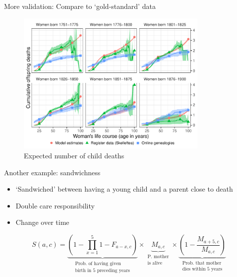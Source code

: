 \documentclass[
  ignorenonframetext,
]{beamer}
\providecommand{\tightlist}{%
  \setlength{\itemsep}{0pt}\setlength{\parskip}{0pt}}
\begin{document}
\begin{frame}{More validation: Compare to `gold-standard' data}
\protect\hypertarget{more-validation-compare-to-gold-standard-data}{}

\begin{figure}
\centering
\includegraphics[width=3.64583in,height=\textheight]{resources/comparative}
\caption{Expected number of child deaths}
\end{figure}

\end{frame}

\begin{frame}{Another example: sandwichness}
\protect\hypertarget{another-example-sandwichness}{}

\begin{itemize}
\tightlist
\item
  `Sandwiched' between having a young child and a parent close to death
\item
  Double care responsibility
\item
  Change over time
\end{itemize}

\begin{equation*}
S(a,c) = \underbrace{  (1 -  \prod_{x=1}^{5} 1 - F_{a-x,c} )      }_{\substack{   \text{Prob. of having given}\\ \text{birth in 5 preceding years}}   } \times \underbrace{M_{a, c}}_{\substack{\text{P. mother}\\ \text{is alive}}} \times  \underbrace{(1-  \frac{M_{a+5, c}}{M_{a, c}})}_{\substack{\text{Prob. that mother}\\ \text{dies within 5 years}}} 
\end{equation*}

\end{frame}
\end{document}
